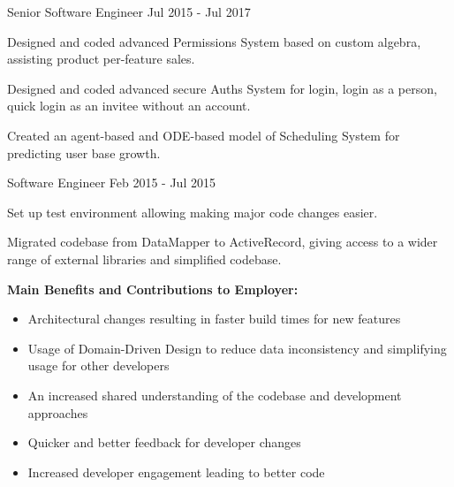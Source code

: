 \begin{cventries}
    \cventry
    {Senior Software Engineer} %
    {} %
    {} %
    {Jul 2015 - Jul 2017} %
    {
      \begin{cvitems} %
        \item {Designed and coded advanced Permissions System based on custom algebra, assisting product per-feature sales.}
        \item {Designed and coded advanced secure Auths System for login, login as a person, quick login as an invitee without an account.}
        \item {Created an agent-based and ODE-based model of Scheduling System for predicting user base growth.}
      \end{cvitems}
    }

    \cventry
    {Software Engineer} %
    {} %
    {} %
    {Feb 2015 - Jul 2015} %
    {
      \begin{cvitems} %
        \item {Set up test environment allowing making major code changes easier.}
        \item {Migrated codebase from DataMapper to ActiveRecord, giving access to a wider range of external libraries and simplified codebase.}
      \end{cvitems}
    }

\end{cventries}

\begin{cvparagraph}

\textbf{Main Benefits and Contributions to Employer:}

\begin{itemize}
  \item Architectural changes resulting in faster build times for new features
  \item Usage of Domain-Driven Design to reduce data inconsistency and simplifying usage for other developers
  \item An increased shared understanding of the codebase and development approaches
  \item Quicker and better feedback for developer changes
  \item Increased developer engagement leading to better code
\end{itemize}

\end{cvparagraph}



